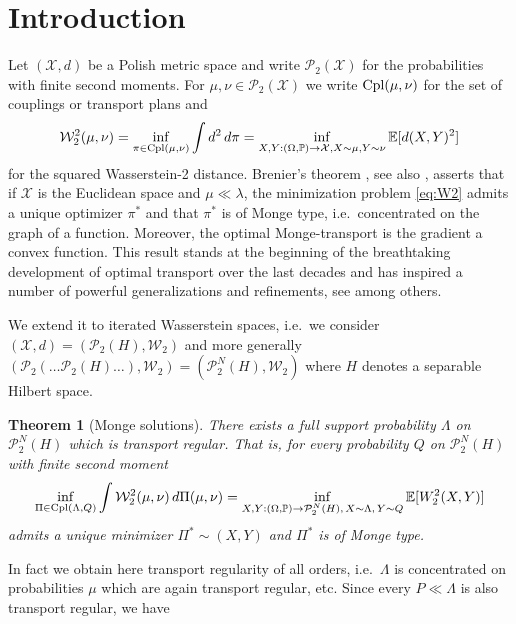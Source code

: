 \documentclass[a4paper]{amsart}
\newtheorem{theorem}{Theorem}
\numberwithin{theorem}{section}
\theoremstyle{definition}
\newcommand{\X}{\mathcal{X}}
\newcommand{\E}{\mathbb{E}}
\newcommand{\cpl}{\textup{Cpl}}
\newcommand{\W}{\mathcal{W}}
\newcommand{\Pc}{\mathcal P}
\renewcommand{\P}{\mathbb{P}}
\renewcommand{\H}{H}
\begin{document}
\section{Introduction}
Let  $(\X,d)$ be a Polish metric space and write $\Pc_2(\X)$ for the probabilities with finite second moments. For  $\mu, \nu\in \Pc_2(\X)$ we write $\cpl(\mu, \nu)$ for the set of couplings or transport plans 
and \begin{align}\label{eq:W2} \W_2^2(\mu, \nu)= \inf_{\pi \in\cpl(\mu, \nu) } \int d^2\, d\pi = \inf_{X,Y:(\Omega, \P) \to \X, X\sim \mu, Y\sim \nu} \E[d(X,Y)^2]\end{align}
 for the squared Wasserstein-2   distance.
 Brenier's  theorem \cite{Br91}, see also \cite{KnSm84, RaRu90},  asserts that if $\X$  is  the Euclidean space and $\mu\ll \lambda$, the minimization problem \eqref{eq:W2} admits a unique optimizer $\pi^*$ and that $\pi^*$ is of Monge type, i.e.\ concentrated on the graph of a function. Moreover, the optimal Monge-transport is the gradient a convex function. This result stands at the beginning of the breathtaking development of optimal transport over the last decades and has inspired a number of powerful generalizations and refinements, see \cite{Gi11, Mc95, GaMc96, Mc01, AmKiPr04, AgCa11, ChPa2011, EmPa25} among others. 

We extend it to iterated Wasserstein spaces, i.e.\ we consider $(\X, d)= (\Pc_2(H), \W_2)$ and more generally   $ (\Pc_2(\ldots\Pc_2(
H)\ldots), \W_2) = (\Pc_2^N(H), \W_2)$ where $\H$ denotes a separable Hilbert space.  

\begin{theorem}[Monge solutions]\label{Thm:MainMongeIntro}
    There exists a full support probability $\Lambda$ on $\Pc_2^N(H)$  which is \emph{transport regular}. That is, for every probability $Q$ on $\Pc_2^N(H)$ with finite second moment %
    \begin{align}\label{eq:IteratedW2Intro}  \inf_{\Pi \in\cpl(\Lambda, Q) } \int \W_2^2 (\mu, \nu) \, d\Pi(\mu,\nu) = \inf_{X,Y:(\Omega, \P) \to \Pc_2^N(H),\, X\sim \Lambda,\, Y\sim Q} \E[W_2^2( X, Y)]\end{align}  admits a unique minimizer $\Pi^*\sim (X,Y)$ and $\Pi^*$ is of Monge type.  
\end{theorem} 
In fact we obtain here transport regularity of all orders, i.e.\ $\Lambda $ is concentrated on probabilities $\mu$ which are again transport regular, etc. Since every $P\ll \Lambda$ is also transport regular, we have
\end{document}
